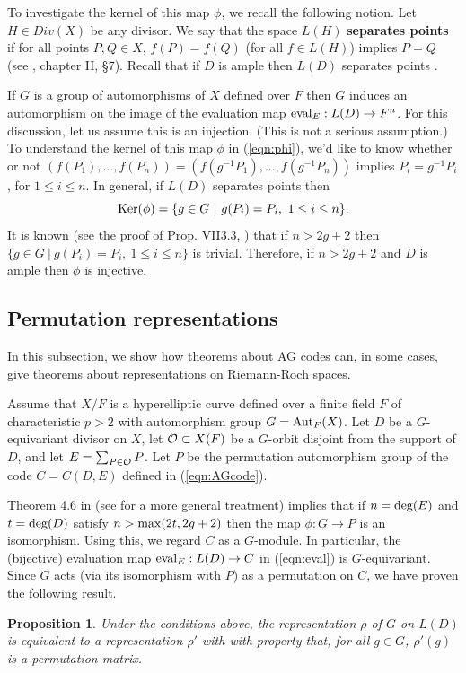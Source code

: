 \documentclass[12pt]{article}
\newtheorem{proposition}[theorem]{Proposition}
\numberwithin{equation}{section}
\def\Aut{{\rm{Aut}}}
\def\eval{{\rm{eval}}}
\begin{document}
To investigate the kernel of this map $\phi$, 
we recall the following 
notion. Let $H\in Div(X)$ be any divisor.
We say that the space $L(H)$ {\bf separates points} if for
all points $P,Q\in X$,
$f(P)=f(Q)$ (for all $f\in L(H)$) 
implies $P=Q$ (see \cite{H}, chapter II, \S 7). 
Recall that if $D$ is ample then $L(D)$ separates points \cite{H}.

If $G$ is a group of automorphisms of $X$ defined over $F$
then $G$ induces an automorphism on the image of 
the evaluation map $\eval_E : L(D)\rightarrow F^n$.
For this discussion, let us assume this is an injection.
(This is not a serious assumption.) 
To understand the kernel of this map $\phi$ in (\ref{eqn:phi}),
we'd like to know whether or not
$(f(P_1),...,f(P_n))=(f(g^{-1}P_1),...,f(g^{-1}P_n))$
implies $P_i=g^{-1}P_i$, for $1\leq i\leq n$.
In general, if $L(D)$ separates points then
\[
{\rm Ker}(\phi)=\{g\in G\ |\ g(P_i)=P_i,\ 1\leq i\leq n\}.
\]
It is known (see the proof of Prop. VII3.3, \cite{Sti}) that
if $n>2g+2$ then $\{g\in G\ |\ g(P_i)=P_i,\ 1\leq i\leq n\}$
is trivial. Therefore, if $n>2g+2$ and 
$D$ is ample then $\phi$ is injective.

\subsection{Permutation representations}

In this subsection, we show how theorems about AG codes
can, in some cases, give theorems about representations on
Riemann-Roch spaces.

Assume that $X/F$ is a hyperelliptic curve defined 
over a finite field $F$ 
of characteristic $p>2$ with automorphism 
group $G=\Aut_F(X)$. 
Let $D$ be a $G$-equivariant
divisor on $X$, let ${\cal O}\subset X(F)$ be a 
$G$-orbit disjoint from the support of $D$, and let
$E=\sum_{P\in {\cal O}}P$. 
Let $P$ be the permutation automorphism
group of the code $C=C(D,E)$ defined in 
(\ref{eqn:AGcode}). 

Theorem 4.6 in \cite{W} (see \cite{JK1} for a more
general treatment)
implies that if $n={\rm deg}(E)$ and
$t={\rm deg}(D)$ satisfy $n>{\rm max}(2t,2g+2)$ then
the map $\phi:G\rightarrow P$ is an isomorphism.
Using this, we regard $C$ as a $G$-module.
In particular, the (bijective) evaluation map 
$\eval_E:L(D)\rightarrow C$ in (\ref{eqn:eval})
is $G$-equivariant.
Since $G$ acts (via its isomorphism with $P$) as a permutation
on $C$, we have proven the following result.

\begin{proposition}
Under the conditions above, the representation 
$\rho$ of $G$ on $L(D)$
is equivalent to a representation $\rho'$ with with property that,
for all $g\in G$, $\rho'(g)$ is a permutation matrix.

\end{proposition}
\end{document}

